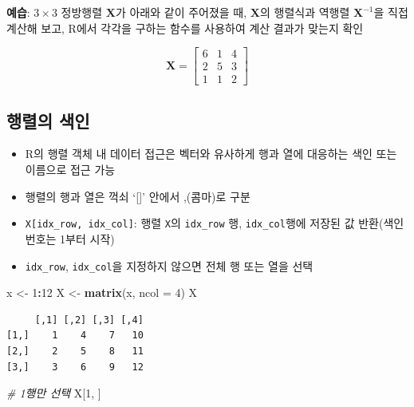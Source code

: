 \documentclass[
  11pt,
]{krantz}
\newenvironment{Shaded}{\begin{snugshade}}{\end{snugshade}}
\newcommand{\CommentTok}[1]{\textcolor[rgb]{0.37,0.37,0.37}{\textit{#1}}}
\newcommand{\DataTypeTok}[1]{\textcolor[rgb]{0.27,0.27,0.27}{#1}}
\newcommand{\DecValTok}[1]{\textcolor[rgb]{0.06,0.06,0.06}{#1}}
\newcommand{\KeywordTok}[1]{\textcolor[rgb]{0.27,0.27,0.27}{\textbf{#1}}}
\newcommand{\NormalTok}[1]{#1}
\newcommand{\OperatorTok}[1]{\textcolor[rgb]{0.43,0.43,0.43}{\textbf{#1}}}
\newcommand{\StringTok}[1]{\textcolor[rgb]{0.5,0.5,0.5}{#1}}
\providecommand{\tightlist}{%
  \setlength{\itemsep}{0pt}\setlength{\parskip}{0pt}}
\let\BeginKnitrBlock\begin \let\EndKnitrBlock\end
\begin{document}
\normalsize

\footnotesize

\BeginKnitrBlock{rmdimportant}
\textbf{예습}: \(3\times 3\) 정방행렬 \(\mathrm{\mathbf{X}}\)가 아래와 같이 주어졌을 때, \(\mathrm{\mathbf{X}}\)의 행렬식과 역행렬 \(\mathrm{\mathbf{X}}^{-1}\)을 직접 계산해 보고, R에서 각각을 구하는 함수를 사용하여 계산 결과가 맞는지 확인

\[\mathrm{\mathbf{X}} = 
\begin{bmatrix}
6 & 1 & 4 \\
2 & 5 & 3 \\
1 & 1 & 2
\end{bmatrix}
\]
\EndKnitrBlock{rmdimportant}

\normalsize

\hypertarget{mat-index}{%
\subsection{행렬의 색인}\label{mat-index}}

\begin{itemize}
\tightlist
\item
  R의 행렬 객체 내 데이터 접근은 벡터와 유사하게 행과 열에 대응하는 색인 또는 이름으로 접근 가능
\item
  행렬의 행과 열은 꺽쇠 `{[}{]}' 안에서 ,(콤마)로 구분
\item
  \texttt{X{[}idx\_row,\ idx\_col{]}}: 행렬 \texttt{X}의 \texttt{idx\_row} 행, \texttt{idx\_col}행에 저장된 값 반환(색인번호는 1부터 시작)
\item
  \texttt{idx\_row}, \texttt{idx\_col}을 지정하지 않으면 전체 행 또는 열을 선택
\end{itemize}

\footnotesize

\begin{Shaded}
\begin{Highlighting}[]
\NormalTok{x <-}\StringTok{ }\DecValTok{1}\OperatorTok{:}\DecValTok{12}
\NormalTok{X <-}\StringTok{ }\KeywordTok{matrix}\NormalTok{(x, }\DataTypeTok{ncol =} \DecValTok{4}\NormalTok{)}
\NormalTok{X}
\end{Highlighting}
\end{Shaded}

\begin{verbatim}
     [,1] [,2] [,3] [,4]
[1,]    1    4    7   10
[2,]    2    5    8   11
[3,]    3    6    9   12
\end{verbatim}

\begin{Shaded}
\begin{Highlighting}[]
\CommentTok{# 1행만 선택}
\NormalTok{X[}\DecValTok{1}\NormalTok{, ]}
\end{Highlighting}
\end{Shaded}
\end{document}
